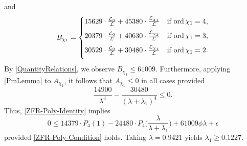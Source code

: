 \documentclass[12pt,psamsfonts]{amsart}
\DeclareRobustCommand{\SkipTocEntry}[5]{}
\theoremstyle{definition}
\theoremstyle{remark}
\numberwithin{equation}{section}
\begin{document}
and
\[
B_{\chi_1} = \begin{cases}
\vspace*{2mm}
15629 \cdot \frac{\cL_0}{\cL} + 45380 \cdot \frac{\cL_{\chi_1}}{\cL} & \text{if } \ord \chi_1 = 4, \\
\vspace*{2mm}
20379 \cdot \frac{\cL_0}{\cL} + 40630 \cdot \frac{\cL_{\chi_1}}{\cL} & \text{if } \ord \chi_1 = 3, \\
\vspace*{2mm}
30529 \cdot \frac{\cL_0}{\cL} + 30480 \cdot \frac{\cL_{\chi_1}}{\cL} & \text{if } \ord \chi_1 = 2. 
\end{cases}
\]
By \cref{QuantityRelations}, we observe $B_{\chi_1} \leq 61009$. Furthermore, applying \cref{PmLemma} to  $A_{\chi_1}$, it follows that $A_{\chi_1} \leq 0$ in all cases provided
\begin{equation}
\frac{14900}{\lambda^4} -  \frac{30480}{(\lambda+\lambda_1)^4} \leq 0.
\label{ZFR-Poly-Condition} 
\end{equation}
Thus, \eqref{ZFR-Poly-Identity}  implies
\[
0 \leq 14379 \cdot P_4(1)  - 24480 \cdot P_4\big( \frac{\lambda}{\lambda+\lambda_1} \big) + 61009 \phi \lambda+ \epsilon
\]
provided \eqref{ZFR-Poly-Condition} holds. Taking $\lambda = 0.9421$ yields $\lambda_1 \geq 0.1227$.


\end{document}
